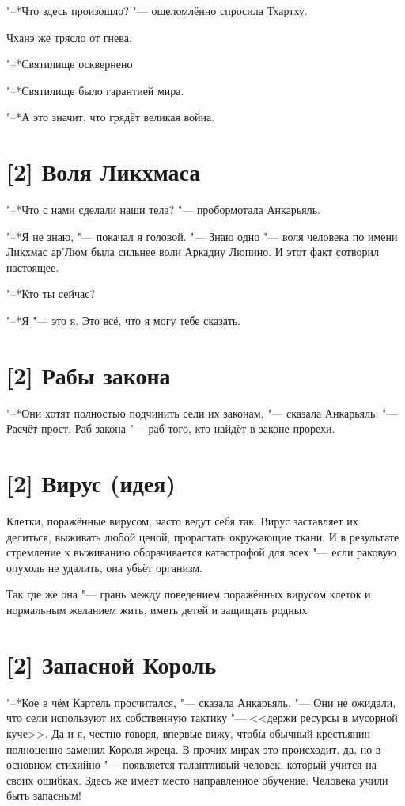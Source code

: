 "--*Что здесь произошло? "--- ошеломлённо спросила Тхартху.

Чханэ же трясло от гнева.

"--*Святилище осквернено\ldotst

\spacing

"--*Святилище было гарантией мира.

"--*А это значит, что грядёт великая война.

\section{[2] Воля Ликхмаса}

"--*Что с нами сделали наши тела? "--- пробормотала Анкарьяль.

"--*Я не знаю, "--- покачал я головой.
"--- Знаю одно "--- воля человека по имени Ликхмас ар'Люм была сильнее воли Аркадиу Люпино.
И этот факт сотворил настоящее.

"--*Кто ты сейчас?

"--*Я "--- это я.
Это всё, что я могу тебе сказать.

\section{[2] Рабы закона}

"--*Они хотят полностью подчинить сели их законам, "--- сказала Анкарьяль.
"--- Расчёт прост.
Раб закона "--- раб того, кто найдёт в законе прорехи.

\section{[2] Вирус (идея)}

Клетки, поражённые вирусом, часто ведут себя так.
Вирус заставляет их делиться, выживать любой ценой, прорастать окружающие ткани.
И в результате стремление к выживанию оборачивается катастрофой для всех "--- если раковую опухоль не удалить, она убьёт организм.

Так где же она "--- грань между поведением поражённых вирусом клеток и нормальным желанием жить, иметь детей и защищать родных\ldotsq

\section{[2] Запасной Король}

"--*Кое в чём Картель просчитался, "--- сказала Анкарьяль.
"--- Они не ожидали, что сели используют их собственную тактику "--- <<держи ресурсы в мусорной куче>>.
Да и я, честно говоря, впервые вижу, чтобы обычный крестьянин полноценно заменил Короля-жреца.
В прочих мирах это происходит, да, но в основном стихийно "--- появляется талантливый человек, который учится на своих ошибках.
Здесь же имеет место направленное обучение.
Человека учили быть запасным!

